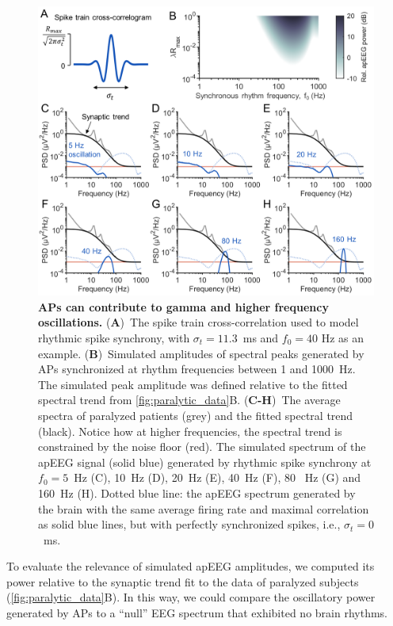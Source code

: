 \begin{figure}[t!]
    \centering
    \includegraphics[width=13.2cm]{Figures/chapter3/figure6.png}
    \caption[APs can contribute to gamma and higher frequency oscillations]{\textbf{APs can contribute to gamma and higher frequency oscillations.} (\textbf{A})~The spike train cross-correlation used to model rhythmic spike synchrony, with $\sigma_t=11.3$~\unit{\milli\second} and $f_0=40$ \unit{\hertz} as an example. (\textbf{B})~Simulated amplitudes of spectral peaks generated by APs synchronized at rhythm frequencies between 1 and 1000~\unit{\hertz}. The simulated peak amplitude was defined relative to the fitted spectral trend from {\autoref{fig:paralytic_data}B}. (\textbf{C-H})~The average spectra of paralyzed patients (grey) and the fitted spectral trend (black). Notice how at higher frequencies, the spectral trend is constrained by the noise floor (red). The simulated spectrum of the apEEG signal (solid blue) generated by rhythmic spike synchrony at $f_0=5$~\unit{\hertz} (C), 10~\unit{\hertz} (D), 20~\unit{\hertz} (E), 40~\unit{\hertz} (F), 80 ~\unit{\hertz} (G) and 160~\unit{\hertz} (H). Dotted blue line: the apEEG spectrum generated by the brain with the same average firing rate and maximal correlation as solid blue lines, but with perfectly synchronized spikes, i.e., $\sigma_t=0$~\unit{\milli\second}.}
    \label{fig:oscillations}
\end{figure}

To evaluate the relevance of simulated apEEG amplitudes, we computed its power relative to the synaptic trend fit to the data of paralyzed subjects ({\autoref{fig:paralytic_data}B}). In this way, we could compare the oscillatory power generated by APs to a ``null'' EEG spectrum that exhibited no brain rhythms.

